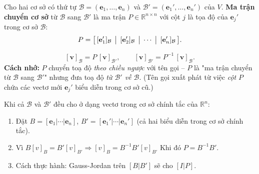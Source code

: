 \documentclass[12pt,a4paper]{article}
\begin{document}
\begin{dinhnghia}
  Cho hai cơ sở có thứ tự $\mathcal{B} = (\mathbf{e}_1, \ldots, \mathbf{e}_n)$ và $\mathcal{B}' = (\mathbf{e}_1', \ldots, \mathbf{e}_n')$ của $V$. \textbf{Ma trận chuyển cơ sở} từ $\mathcal{B}$ sang $\mathcal{B}'$ là ma trận $P \in \mathbb{R}^{n\times n}$ với cột $j$ là tọa độ của $\mathbf{e}_j'$ trong cơ sở $\mathcal{B}$:
  \[
    P = \bigl[\,[\mathbf{e}_1']_{\mathcal{B}}\,\bigm|\, [\mathbf{e}_2']_{\mathcal{B}}\,\bigm|\,\cdots\,\bigm|\, [\mathbf{e}_n']_{\mathcal{B}}\,\bigr].
  \]
\end{dinhnghia}

\begin{congthuc}[title={Công thức đổi tọa độ}]
\[
  [\mathbf{v}]_{\mathcal{B}} = P\,[\mathbf{v}]_{\mathcal{B}'},\qquad [\mathbf{v}]_{\mathcal{B}'} = P^{-1}\,[\mathbf{v}]_{\mathcal{B}}.
\]
\textbf{Cách nhớ:} $P$ chuyển toạ độ \emph{theo chiều ngược} với tên gọi -- $P$ là "ma trận chuyển từ $\mathcal{B}$ sang $\mathcal{B}'$" nhưng đưa toạ độ \emph{từ $\mathcal{B}'$ về $\mathcal{B}$}. (Tên gọi xuất phát từ việc \emph{cột} $P$ chứa các vectơ mới $\mathbf{e}_j'$ biểu diễn trong cơ sở cũ.)
\end{congthuc}

\begin{phuongphap}[title={Tính ma trận chuyển cơ sở}]
Khi cả $\mathcal{B}$ và $\mathcal{B}'$ đều cho ở dạng vectơ trong cơ sở chính tắc của $\mathbb{R}^n$:
\begin{enumerate}
  \item Đặt $B = [\mathbf{e}_1 | \cdots | \mathbf{e}_n]$, $B' = [\mathbf{e}_1' | \cdots | \mathbf{e}_n']$ (cả hai biểu diễn trong cơ sở chính tắc).
  \item Vì $B[v]_B = B'[v]_{B'} \Rightarrow [v]_{B} = B^{-1}B'[v]_{B'}$ Khi đó $P = B^{-1} B'$.
  \item Cách thực hành: Gauss-Jordan trên $[B | B']$ sẽ cho $[I | P]$.
\end{enumerate}
\end{phuongphap}
\end{document}
